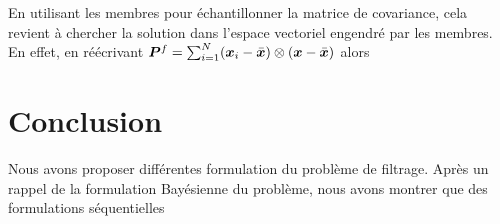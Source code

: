 En utilisant les membres pour échantillonner la matrice de covariance, cela revient à chercher la solution dans l'espace vectoriel engendré par les membres. En effet, en réécrivant $\bm P^f = \sum_{i=1}^{N} (\bm{x}_i - \bar {\bm{x}}) \otimes (\bm{x} - \bar {\bm{x}})$ alors
\section{Conclusion}


Nous avons proposer différentes formulation du problème de filtrage. Après un rappel de la formulation Bayésienne du problème, nous avons montrer que des formulations séquentielles